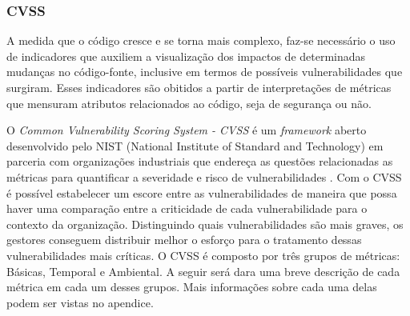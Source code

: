 
%

%


\subsubsection{CVSS}

A medida que o código cresce e se torna mais complexo, faz-se necessário o uso de indicadores que auxiliem a visualização dos impactos de determinadas mudanças no código-fonte, inclusive em termos de possíveis vulnerabilidades que surgiram. Esses indicadores são obitidos a partir de interpretações de métricas que mensuram atributos relacionados ao código, seja de segurança ou não. 

O \emph{Common Vulnerability Scoring System - CVSS} é um \emph{framework} aberto desenvolvido pelo NIST (National Institute of Standard and Technology) em parceria com organizações industriais que endereça as questões relacionadas as métricas para quantificar a severidade e risco de vulnerabilidades \cite{cvss2007}. Com o CVSS é possível estabelecer um escore entre as vulnerabilidades de maneira que possa haver uma comparação entre a criticidade de cada vulnerabilidade para o contexto da organização. Distinguindo quais vulnerabilidades são mais graves, os gestores conseguem distribuir melhor o esforço para o tratamento dessas vulnerabilidades mais críticas. O CVSS é composto por três grupos de métricas: Básicas, Temporal e Ambiental. A seguir será dara uma breve descrição de cada métrica em cada um desses grupos. Mais informações sobre cada uma delas podem ser vistas no apendice.

